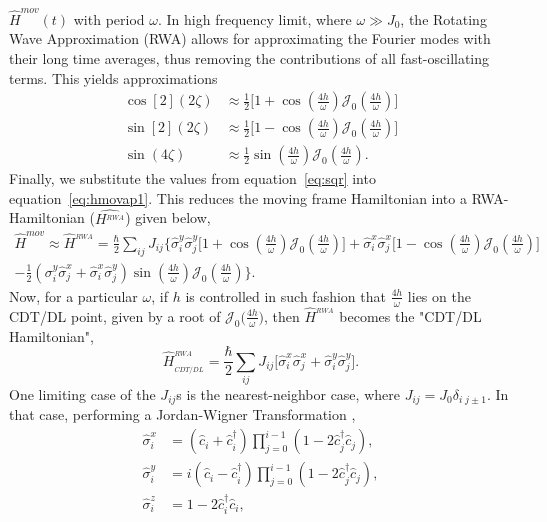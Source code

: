 \documentclass[12pt]{iopart}
\begin{document}
$\hat{H}^{mov}(t)$ with period $\omega$. In high frequency limit, where $\omega \gg J_0$, the Rotating Wave Approximation (RWA) allows for approximating the Fourier modes with their long time averages, thus removing the contributions of all fast-oscillating terms. This yields approximations
\begin{align}
\cos[2](2\zeta) &\approx \frac12 \Bigg[1+ \cos(\frac{4h}{\omega})\mathcal{J}_0\left(\frac{4h}{\omega}\right)\Bigg]\nonumber\\
\sin[2](2\zeta) &\approx \frac12 \Bigg[1- \cos(\frac{4h}{\omega})\mathcal{J}_0\left(\frac{4h}{\omega}\right)\Bigg]\nonumber\\
\sin(4\zeta)&\approx \frac12 \sin(\frac{4h}{\omega})\mathcal{J}_0\left(\frac{4h}{\omega}\right).
\label{eq:sqr}
\end{align}
Finally, we substitute the values from equation~\eqref{eq:sqr} into equation~\eqref{eq:hmovap1}. This reduces the moving frame Hamiltonian into a RWA-Hamiltonian ($\hat{H^{_{RWA}}}$) given below,
\begin{multline}
    \hat{H}^{mov}\approx \hat{H}^{_{RWA}} = \frac{\hbar}{2}\sum_{ij} J_{ij}  \Bigg\{ \hat{\sigma}^y_i\hat{\sigma}^y_j\Bigg[1+ \cos(\frac{4h}{\omega})\mathcal{J}_0\left(\frac{4h}{\omega}\right)\Bigg] +\hat{\sigma}^x_i\hat{\sigma}^x_j \Bigg[1- \cos(\frac{4h}{\omega})\mathcal{J}_0\left(\frac{4h}{\omega}\right)\Bigg] \\
    - \frac12 (\sigma^y_i\hat{\sigma}^x_j + \hat{\sigma}^x_i\hat{\sigma}^y_j)\sin(\frac{4h}{\omega})\mathcal{J}_0\left(\frac{4h}{\omega}\right)\Bigg\}.
    \label{eq:hrwa}
\end{multline}	
Now, for a particular $\omega$, if $h$ is controlled in such fashion that $\frac{4h}{\omega}$ lies on the CDT/DL point, given by a root of $\mathcal{J}_0\Big(\frac{4h}{\omega}\Big)$, then $\hat{H}^{_{RWA}}$ becomes the "CDT/DL Hamiltonian",
\begin{equation}
\hat{H}^{_{RWA}}_{_{CDT/DL}} = \frac{\hbar}{2}\sum_{ij} J_{ij}  \Big[\hat{\sigma}^x_i\hat{\sigma}^x_j + \hat{\sigma}^y_i\hat{\sigma}^y_j\Big].
\label{eq:hrwa:frz}
\end{equation}	
One limiting case of the $J_{ij}$s is the nearest-neighbor case, where $J_{ij} = J_0 \delta_{i\;j\pm1}$. In that case, performing a Jordan-Wigner Transformation ,
\begin{align}
\hat{\sigma}^x_i &= \left(\hat{c}_i + \hat{c}^\dagger_i\right) \prod_{j=0}^{i-1}\left(1-2\hat{c}^\dagger_j \hat{c}^{\;}_j\right),\nonumber\\
\hat{\sigma}^y_i &= i\left(\hat{c}_i - \hat{c}^\dagger_i\right) \prod_{j=0}^{i-1}\left(1-2\hat{c}^\dagger_j \hat{c}^{\;}_j\right),\nonumber\\
\hat{\sigma}^z_i &= 1-2\hat{c}^\dagger_i\hat{c}^{\;}_i,
\end{align}
\end{document}

